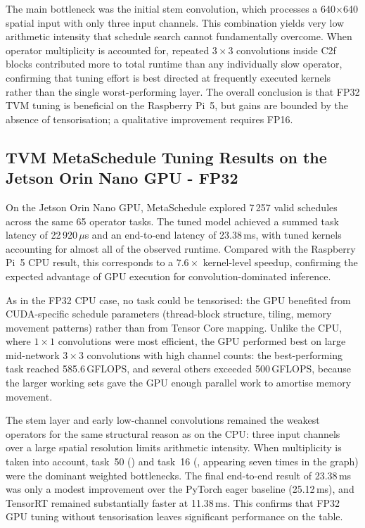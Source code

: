\documentclass[12pt,a4paper]{report}
\begin{document}
The main bottleneck was the initial stem convolution, which processes a 640$\times$640 spatial input with
only three input channels.
This combination yields very low arithmetic intensity that schedule search cannot fundamentally overcome.
When operator multiplicity is accounted for, repeated $3{\times}3$ convolutions inside C2f blocks contributed
more to total runtime than any individually slow operator, confirming that tuning effort is best directed at
frequently executed kernels rather than the single worst-performing layer.
The overall conclusion is that FP32 TVM tuning is beneficial on the Raspberry Pi~5, but gains are bounded
by the absence of tensorisation; a qualitative improvement requires FP16.

\subsection{TVM MetaSchedule Tuning Results on the Jetson Orin Nano GPU - FP32}

On the Jetson Orin Nano GPU, MetaSchedule explored 7\,257 valid schedules across the same 65 operator tasks.
The tuned model achieved a summed task latency of 22\,920\,$\mu$s and an end-to-end latency of 23.38\,ms,
with tuned kernels accounting for almost all of the observed runtime.
Compared with the Raspberry Pi~5 CPU result, this corresponds to a \(7.6\times\) kernel-level speedup,
confirming the expected advantage of GPU execution for convolution-dominated inference.

As in the FP32 CPU case, no task could be tensorised: the GPU benefited from CUDA-specific schedule
parameters (thread-block structure, tiling, memory movement patterns) rather than from Tensor Core mapping.
Unlike the CPU, where $1{\times}1$ convolutions were most efficient, the GPU performed best on large
mid-network $3{\times}3$ convolutions with high channel counts: the best-performing task reached
585.6\,GFLOPS, and several others exceeded 500\,GFLOPS, because the larger working sets gave the GPU
enough parallel work to amortise memory movement.

The stem layer and early low-channel convolutions remained the weakest operators for the same structural
reason as on the CPU: three input channels over a large spatial resolution limits arithmetic intensity.
When multiplicity is taken into account, task~50 () and task~16 (, appearing
seven times in the graph) were the dominant weighted bottlenecks.
The final end-to-end result of 23.38\,ms was only a modest improvement over the PyTorch eager baseline
(25.12\,ms), and TensorRT remained substantially faster at 11.38\,ms.
This confirms that FP32 GPU tuning without tensorisation leaves significant performance on the table.
\end{document}
